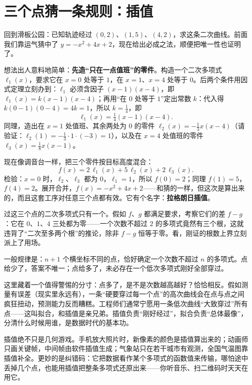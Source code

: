 \section{三个点猜一条规则：插值}

回到滑板公园：已知轨迹经过 $(0,2)$、$(1,5)$、$(4,2)$，求这条二次曲线。前面我们靠运气猜中了 $y=-x^2+4x+2$，现在给出必成之法，顺便把唯一性也证明了。

想法出人意料地简单：\textbf{先造“只在一点值班”的零件}。构造一个二次多项式 $\ell_1(x)$，要求它在 $x=0$ 处等于 $1$，在 $x=1$、$x=4$ 处等于 $0$。后两个条件用因式定理立刻办到：$\ell_1$ 必须含因子 $(x-1)(x-4)$，即 $\ell_1(x)=k(x-1)(x-4)$；再用“在 $0$ 处等于 $1$”定出常数 $k$：代入得 $k(0-1)(0-4)=4k=1$，所以 $k=\frac{1}{4}$，即
\[
\ell_1(x)=\tfrac{1}{4}(x-1)(x-4).
\]
同理，造出在 $x=1$ 处值班、其余两处为 $0$ 的零件 $\ell_2(x)=-\tfrac{1}{3}x(x-4)$（请验证：$\ell_2(1)=-\frac{1}{3}\cdot 1\cdot(-3)=1$），以及在 $x=4$ 处值班的零件 $\ell_3(x)=\tfrac{1}{8}x(x-1)$。

现在像调音台一样，把三个零件按目标高度混合：
\[
f(x) = 2\,\ell_1(x) + 5\,\ell_2(x) + 2\,\ell_3(x).
\]
检验：$x=0$ 时，$\ell_2$、$\ell_3$ 都为 $0$，$\ell_1=1$，所以 $f(0)=2$；同理 $f(1)=5$，$f(4)=2$。展开合并，$f(x)=-x^2+4x+2$——和猜的一样，但这次是算出来的，而且这套工序对任意三个点都有效。它有个名字：\textbf{拉格朗日插值}。

\begin{zhu}[唯一性]
过这三个点的二次多项式只有一个。假如 $f$、$g$ 都满足要求，考察它们的差 $f-g$：它在 $0$、$1$、$4$ 三处都为零——一个次数不超过 $2$ 的多项式竟然有三个根，这就违背了“二次至多两个根”的推论，除非 $f-g$ 恒等于零。看，刚证的根数上界立刻派上了用场。
\end{zhu}

一般规律是：$n+1$ 个横坐标不同的点，恰好确定一个次数不超过 $n$ 的多项式。点给少了，答案不唯一；点给多了，未必存在一个低次多项式刚好全部穿过。

这里藏着一个值得警惕的分寸：点多了，是不是次数越高越好？恰恰相反。假如测量有误差（现实里永远有），一条“硬要穿过每一个点”的高次曲线会在点与点之间疯狂扭动，预测能力反而糟糕。工程师们通常宁愿用一条低次曲线“大致穿过”所有点——这叫拟合，和插值是亲兄弟。插值负责“刚好经过”，拟合负责“总体最像”，分清什么时候用谁，是数据时代的基本功。

\begin{lianjie}
插值绝不只是几何游戏。手机放大照片时，新像素的颜色是插值算出来的；动画师只画关键帧，中间帧由软件插值生成；气象站只在若干城市有观测，全国气温图靠插值补全。更妙的是纠错码：它把数据看作某个多项式的函数值来传输，哪怕途中丢掉几个点，也能用插值把整条多项式还原出来——你听音乐、扫二维码时天天在用它。
\end{lianjie}

